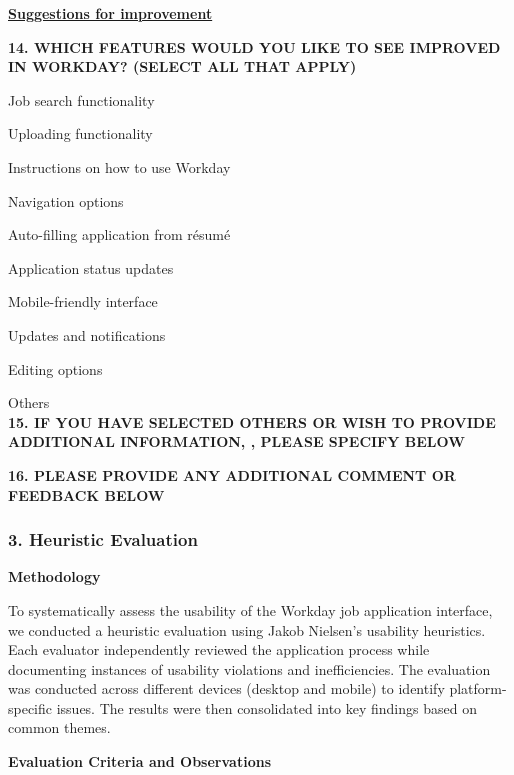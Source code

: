 \documentclass[
	letterpaper, %
]{jdf}
\begin{document}
\underline{\textbf{Suggestions for improvement }}

\textbf{14. WHICH FEATURES WOULD YOU LIKE TO SEE IMPROVED IN WORKDAY? (SELECT ALL THAT APPLY)
}

Job search functionality

Uploading functionality

Instructions on how to use Workday

Navigation options

Auto-filling application from résumé  

Application status updates 

Mobile-friendly interface

Updates and notifications

Editing options 

Others \\

\textbf{15. IF YOU HAVE SELECTED OTHERS OR WISH TO PROVIDE ADDITIONAL INFORMATION, , PLEASE SPECIFY BELOW}

\textbf{16. PLEASE PROVIDE ANY ADDITIONAL COMMENT OR FEEDBACK BELOW	
}
\hfill \break
\hfill \break
\subsubsection{3. Heuristic Evaluation}

\textbf{Methodology}  

To systematically assess the usability of the Workday job application interface, we conducted a heuristic evaluation using Jakob Nielsen’s usability heuristics. Each evaluator independently reviewed the application process while documenting instances of usability violations and inefficiencies. The evaluation was conducted across different devices (desktop and mobile) to identify platform-specific issues. The results were then consolidated into key findings based on common themes.  

\textbf{Evaluation Criteria and Observations}  
\end{document}
